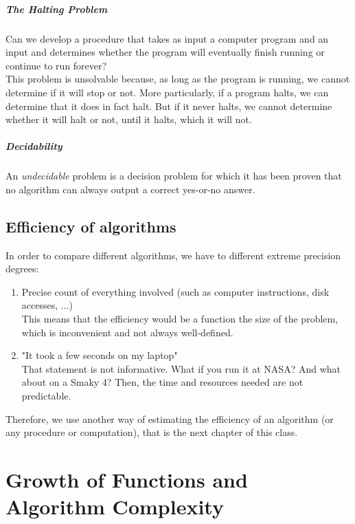 \documentclass[10pt,a4paper]{book}
\newcommand{\ind}{\hspace*{\parindent}}
\begin{document}
\paragraph*{The Halting Problem}
$\ $\\
\ind Can we develop a procedure that takes as input a computer program and an input and determines whether the program will eventually finish running or continue to run forever?\\
\ind This problem is unsolvable because, as long as the program is running, we cannot determine if it will stop or not. More particularly, if a program halts, we can determine that it does in fact halt. But if it never halts, we cannot determine whether it will halt or not, until it halts, which it will not.
\paragraph*{Decidability}
An \textit{undecidable} problem is a decision problem for which it has been proven that no algorithm can always output a correct yes-or-no answer.

\section{Efficiency of algorithms}
In order to compare different algorithms, we have to different extreme precision degrees:
\begin{enumerate}
\item Precise count of everything involved (such as computer instructions, disk accesses, ...)\\
This means that the efficiency would be a function the size of the problem, which is inconvenient and not always well-defined.
\item "It took a few seconds on my laptop"\\
That statement is not informative. What if you run it at NASA? And what about on a Smaky 4? Then, the time and resources needed are not predictable.
\end{enumerate}
Therefore, we use another way of estimating the efficiency of an algorithm (or any procedure or computation), that is the next chapter of this class.

\chapter{Growth of Functions and Algorithm Complexity}
\end{document}
